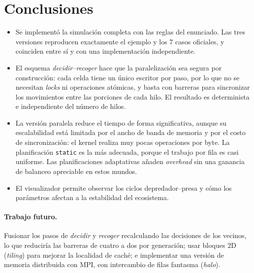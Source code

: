 \documentclass[11pt,a4paper]{article}
\begin{document}


\section{Conclusiones}
\begin{itemize}
  \item Se implementó la simulación completa con las reglas del enunciado. Las tres versiones reproducen
    exactamente el ejemplo y los 7 casos oficiales, y coinciden entre sí y con una implementación
    independiente.
  \item El esquema \emph{decidir--recoger} hace que la paralelización sea segura por construcción: cada
    celda tiene un único escritor por paso, por lo que no se necesitan \emph{locks} ni operaciones atómicas,
    y basta con barreras para sincronizar los movimientos entre las porciones de cada hilo. El resultado es
    determinista e independiente del número de hilos.
  \item La versión paralela reduce el tiempo de forma significativa, aunque su escalabilidad está limitada
    por el ancho de banda de memoria y por el costo de sincronización: el kernel realiza muy pocas
    operaciones por byte. La planificación \texttt{static} es la más adecuada, porque el trabajo por fila es
    casi uniforme. Las planificaciones adaptativas añaden \emph{overhead} sin una ganancia de balanceo
    apreciable en estos mundos.
  \item El visualizador permite observar los ciclos depredador--presa y cómo los parámetros afectan a la
    estabilidad del ecosistema.
\end{itemize}

\paragraph{Trabajo futuro.} Fusionar los pasos de \emph{decidir} y \emph{recoger} recalculando las
decisiones de los vecinos, lo que reduciría las barreras de cuatro a dos por generación; usar bloques 2D
(\emph{tiling}) para mejorar la localidad de caché; e implementar una versión de memoria distribuida con MPI,
con intercambio de filas fantasma (\emph{halo}).

\appendix
\end{document}
